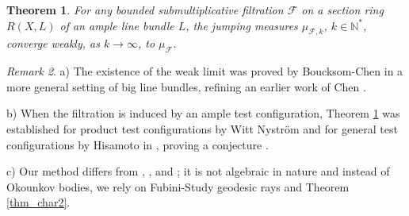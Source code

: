 \documentclass[12pt]{article}
\numberwithin{equation}{section}
\theoremstyle{theorem}
\newtheorem{thm}{Theorem}[section]
\theoremstyle{definition}
\theoremstyle{remark}
\newtheorem{rem}[thm]{Remark}
\newcommand{\nat}{\mathbb{N}}
\begin{document}
	\begin{thm}\label{thm_filt}
		For any bounded submultiplicative filtration $\mathcal{F}$ on a section ring $R(X, L)$ of an ample line bundle $L$, the jumping measures $\mu_{\mathcal{F}, k}$, $k \in \nat^*$, converge weakly, as $k \to \infty$, to $\mu_{\mathcal{F}}$.
	\end{thm}
	\begin{rem}
		a) The existence of the weak limit was proved by Boucksom-Chen \cite{BouckChen} in a more general setting of big line bundles, refining an earlier work of Chen \cite{ChenHNolyg}.
		\par 
		b) When the filtration is induced by an ample test configuration, Theorem \ref{thm_filt} was established for product test configurations by Witt Nystr{\"o}m \cite[Theorems 1.1 and 1.4]{NystOkounTest} and for general test configurations by Hisamoto in \cite[Theorem 1.1]{HisamSpecMeas}, proving a conjecture \cite[after Theorem 1.4]{NystOkounTest}.
		\par 
		c) Our method differs from \cite{ChenHNolyg}, \cite{BouckChen}, \cite{NystOkounTest} and \cite{HisamSpecMeas}; it is not algebraic in nature and instead of Okounkov bodies, we rely on Fubini-Study geodesic rays and Theorem \ref{thm_char2}.
	\end{rem}
\end{document}
